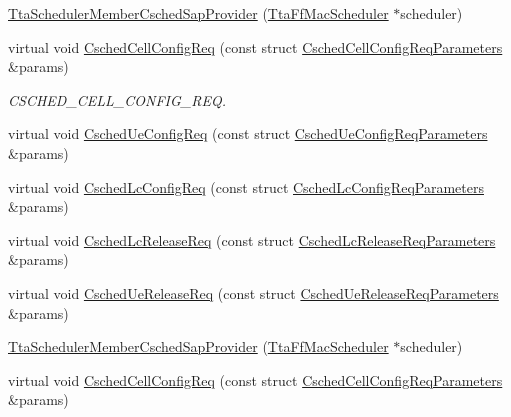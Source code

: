 \begin{DoxyCompactItemize}
\item 
\hyperlink{classns3_1_1TtaSchedulerMemberCschedSapProvider_aaba5974482b1d23511315930a3ec7653}{Tta\+Scheduler\+Member\+Csched\+Sap\+Provider} (\hyperlink{classns3_1_1TtaFfMacScheduler}{Tta\+Ff\+Mac\+Scheduler} $\ast$scheduler)
\item 
virtual void \hyperlink{classns3_1_1TtaSchedulerMemberCschedSapProvider_a407faf762a9414b16293b8e71d065403}{Csched\+Cell\+Config\+Req} (const struct \hyperlink{structns3_1_1FfMacCschedSapProvider_1_1CschedCellConfigReqParameters}{Csched\+Cell\+Config\+Req\+Parameters} \&params)
\begin{DoxyCompactList}\small\item\em C\+S\+C\+H\+E\+D\+\_\+\+C\+E\+L\+L\+\_\+\+C\+O\+N\+F\+I\+G\+\_\+\+R\+EQ. \end{DoxyCompactList}\item 
virtual void \hyperlink{classns3_1_1TtaSchedulerMemberCschedSapProvider_a67b859352a8d57fb6daf93f1dd101b17}{Csched\+Ue\+Config\+Req} (const struct \hyperlink{structns3_1_1FfMacCschedSapProvider_1_1CschedUeConfigReqParameters}{Csched\+Ue\+Config\+Req\+Parameters} \&params)
\item 
virtual void \hyperlink{classns3_1_1TtaSchedulerMemberCschedSapProvider_abd8b59eba24972d34f1030a5892f8f59}{Csched\+Lc\+Config\+Req} (const struct \hyperlink{structns3_1_1FfMacCschedSapProvider_1_1CschedLcConfigReqParameters}{Csched\+Lc\+Config\+Req\+Parameters} \&params)
\item 
virtual void \hyperlink{classns3_1_1TtaSchedulerMemberCschedSapProvider_af3ee1ecf32510b04854ae135b589e017}{Csched\+Lc\+Release\+Req} (const struct \hyperlink{structns3_1_1FfMacCschedSapProvider_1_1CschedLcReleaseReqParameters}{Csched\+Lc\+Release\+Req\+Parameters} \&params)
\item 
virtual void \hyperlink{classns3_1_1TtaSchedulerMemberCschedSapProvider_a317fc90d9775fd1837d00e81ed1e1431}{Csched\+Ue\+Release\+Req} (const struct \hyperlink{structns3_1_1FfMacCschedSapProvider_1_1CschedUeReleaseReqParameters}{Csched\+Ue\+Release\+Req\+Parameters} \&params)
\item 
\hyperlink{classns3_1_1TtaSchedulerMemberCschedSapProvider_aaba5974482b1d23511315930a3ec7653}{Tta\+Scheduler\+Member\+Csched\+Sap\+Provider} (\hyperlink{classns3_1_1TtaFfMacScheduler}{Tta\+Ff\+Mac\+Scheduler} $\ast$scheduler)
\item 
virtual void \hyperlink{classns3_1_1TtaSchedulerMemberCschedSapProvider_a5962b4dcf308faac90dd991049aaa379}{Csched\+Cell\+Config\+Req} (const struct \hyperlink{structns3_1_1FfMacCschedSapProvider_1_1CschedCellConfigReqParameters}{Csched\+Cell\+Config\+Req\+Parameters} \&params)

\end{DoxyCompactItemize}
